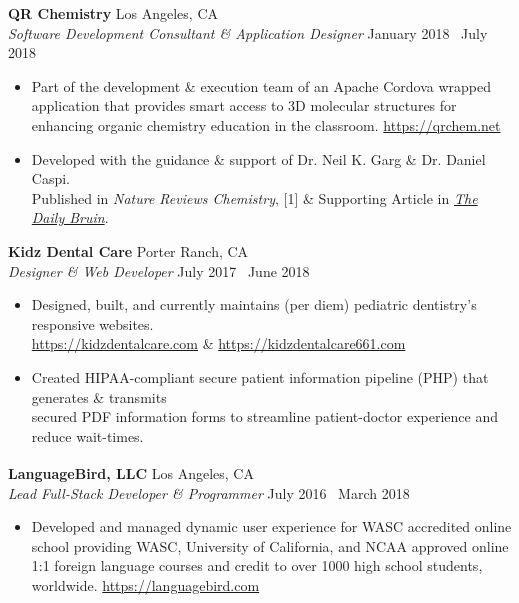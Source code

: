 \documentclass[margin]{res}
\begin{document}
\begin{resume}
		{\bf QR Chemistry} \hfill Los Angeles, CA \\
		{\it Software Development Consultant \& Application Designer} \hfill January 2018 \textendash\ July 2018
		\begin{itemize} \itemsep -2pt
			\item Part of the development \& execution team of an Apache Cordova wrapped application that provides smart access to 3D molecular structures for enhancing organic chemistry education in the classroom. \textcolor{RoyalBlue}{\url{https://qrchem.net}}
			\item Developed with the guidance \& support of Dr. Neil K. Garg \& Dr. Daniel Caspi. \\Published in {\it Nature Reviews Chemistry}, [1] \& Supporting Article in \textcolor{RoyalBlue}{\href{https://dailybruin.com/2018/07/30/student-developed-tool-brings-3d-molecular-models-to-smartphone-screen/}{\it The Daily Bruin}}.
		\end{itemize}
		
		{\bf Kidz Dental Care} \hfill Porter Ranch, CA \\
		{\it Designer \& Web Developer} \hfill July 2017 \textendash\ June 2018
		\begin{itemize} \itemsep -2pt
			\item Designed, built, and currently maintains (per diem) pediatric dentistry's responsive websites. \\ \textcolor{RoyalBlue}{\url{https://kidzdentalcare.com}} \& \textcolor{RoyalBlue}{\url{https://kidzdentalcare661.com}}
			\item Created HIPAA-compliant secure patient information pipeline (PHP) that generates \& transmits \\ secured PDF information forms to streamline patient-doctor experience and reduce wait-times.
		\end{itemize}
		\vspace{0.02cm} 
		{\bf LanguageBird\textsuperscript{\textregistered}, LLC} \hfill Los Angeles, CA \\
		{\it Lead Full-Stack Developer \& Programmer} \hfill July 2016 \textendash\ March 2018
		\begin{itemize} \itemsep -2pt
			\item Developed and managed dynamic user experience for WASC accredited online school providing WASC, University of California, and NCAA approved online 1:1 foreign language courses and credit to over 1000 high school students, worldwide. \textcolor{RoyalBlue}{\url{https://languagebird.com}}
		\end{itemize}
		

\end{resume}
\end{document}
